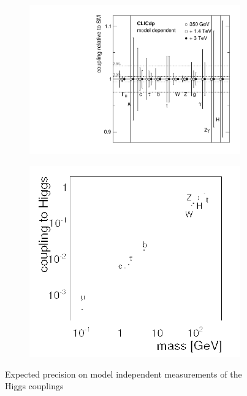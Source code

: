 \begin{figure}
  \centering
  \begin{subfigure}{.4\textwidth}
    \centering
    \includegraphics[width=0.9\linewidth]{Theory/fig/modeldependent2}
  \end{subfigure}
    \begin{subfigure}{.4\textwidth}
    \centering
    \includegraphics[width=1.1\linewidth]{Theory/fig/HiggsCouplings}
  \end{subfigure}
    \caption[Expected precision on model independent measurements of the Higgs couplings]{Expected precision on model independent measurements of the Higgs couplings}
  \label{fig:modelIndependentCouplings}
\end{figure}

